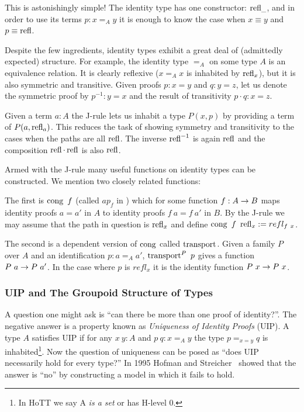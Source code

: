 This is astonishingly simple! The identity type has one constructor: $\operatorname{refl}_{\_}$,
and in order to use its terms $p : x =_A y$ it is enough to know the case when $x
\equiv y$ and $p \equiv \operatorname{refl}$.

Despite the few ingredients, identity types exhibit a great deal of (admittedly
expected) structure. For example, the identity type $=_A$ on some type $A$ is an
equivalence relation. It is clearly reflexive ($x =_A x$ is inhabited by
$\operatorname{refl}_x$), but it is also symmetric and transitive. Given proofs $p : x = y$
and $q : y = z$, let us denote the symmetric proof by $p^{-1} : y = x$ and the
result of transitivity $p \cdot q : x = z$.

Given a term $a:A$ the J-rule lets us inhabit a type $P(x,p)$ by providing a
term of $P(a, \operatorname{refl}_a)$. This reduces the task of showing symmetry and
transitivity to the cases when the paths are all $\operatorname{refl}$. The inverse $\operatorname{refl}^{-1}$
is again $\operatorname{refl}$ and the composition $\operatorname{refl} \cdot \operatorname{refl}$ is also $\operatorname{refl}$.


Armed with the J-rule many useful functions on identity types can be
constructed. We mention two closely related functions:

The first is $\operatorname{cong}~f$ (called $ap_f$ in \cite{hottbook, lemma 2.2.1}) which for some
function $f : A \rightarrow B$ maps identity proofs $a = a'$ in $A$ to identity proofs
$f~a = f~a'$ in $B$. By the J-rule we may assume that the path in question is
$\operatorname{refl}_x$ and define $\operatorname{cong}~f~\operatorname{refl}_x := refl_{f~x}$.

The second is a dependent version of $\operatorname{cong}$ called $\operatorname{transport}$. Given a
family $P$ over $A$ and an identification $p : a =_A a'$, $\operatorname{transport}^P~p$ gives
a function $P~a \rightarrow P~a'$. In the case where $p$ is $refl_{x}$ it is the
identity function $P~x \rightarrow P~x$.


\subsubsection{UIP and The Groupoid Structure of Types}
A question one might ask is ``can there be more than one proof of identity?''.
The negative answer is a property known as \emph{Uniqueness of Identity Proofs} (UIP). A
type $A$ satisfies UIP if for any $x~y : A$ and $p~q : x =_A y$ the type $p =_{x
= y} q$ is inhabited\footnote{In HoTT we say A \emph{is a set} or has H-level 0.}. Now the
question of uniqueness can be posed as ``does UIP necessarily hold for every type?'' In 1995
Hofman and Streicher~\cite{Hofman1998} showed that the answer is ``no'' by
constructing a model in which it fails to hold.

